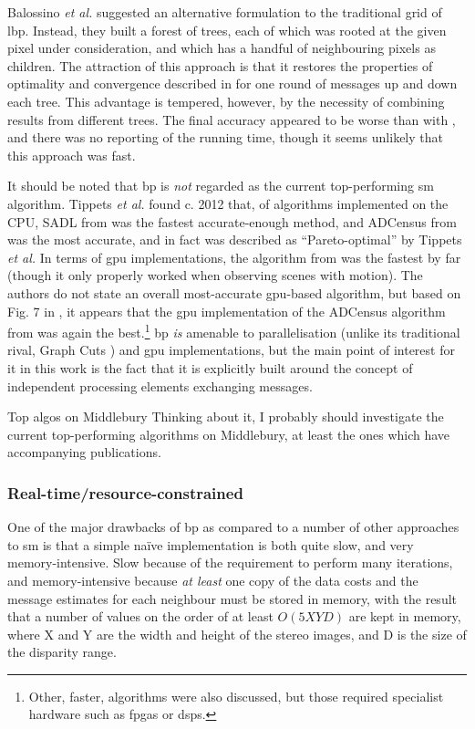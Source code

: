 Balossino \textit{et al.} \cite{Balossino2007} suggested an alternative formulation to the traditional grid of \gls{lbp}.  Instead, they built a forest of trees, each of which was rooted at the given pixel under consideration, and which has a handful of neighbouring pixels as children.  The attraction of this approach is that it restores the properties of optimality and convergence described in \cite{Pearl1982} for one round of messages up and down each tree.  This advantage is tempered, however, by the necessity of combining results from different trees.  The final accuracy appeared to be worse than with \cite{Felzenszwalb2006}, and there was no reporting of the running time, though it seems unlikely that this approach was fast.

It should be noted that \gls{bp} is \emph{not} regarded as the current top-performing \gls{sm} algorithm.  Tippets \textit{et al.} found c. 2012 that, of algorithms implemented on the CPU, SADL from \cite{VanDerMark2006} was the fastest accurate-enough method, and ADCensus from \cite{Mei2011} was the most accurate, and in fact was described as ``Pareto-optimal'' by Tippets \textit{et al.}    In terms of \gls{gpu} implementations, the algorithm from \cite{Zhao2011} was the fastest by far (though it only properly worked when observing scenes with motion).  The authors do not state an overall most-accurate \gls{gpu}-based algorithm, but based on Fig. 7 in \cite{Tippetts2016}, it appears that the \gls{gpu} implementation of the ADCensus algorithm from \cite{Mei2011} was again the best.\footnote{Other, faster, algorithms were also discussed, but those required specialist hardware such as \glspl{fpga} or \glspl{dsp}.}  \Gls{bp} \emph{is} amenable to parallelisation (unlike its traditional rival, Graph Cuts \cite{Tappen2003}) and \gls{gpu} implementations, but the main point of interest for it in this work is the fact that it is explicitly built around the concept of independent processing elements exchanging messages.

\begin{anfxwarning}{Top algos on Middlebury}
    Thinking about it, I probably should investigate the current top-performing algorithms on Middlebury, at least the ones which have accompanying publications.
\end{anfxwarning}

\subsubsection{Real-time/resource-constrained }
One of the major drawbacks of \gls{bp} as compared to a number of other approaches to \gls{sm} is that a simple naïve implementation is both quite slow, and very memory-intensive.  Slow because of the requirement to perform many iterations, and memory-intensive because \emph{at least} one copy of the data costs and the message estimates for each neighbour must be stored in memory, with the result that a number of values on the order of at least \(O(5XYD)\) are kept in memory, where X and Y are the width and height of the stereo images, and D is the size of the disparity range.

